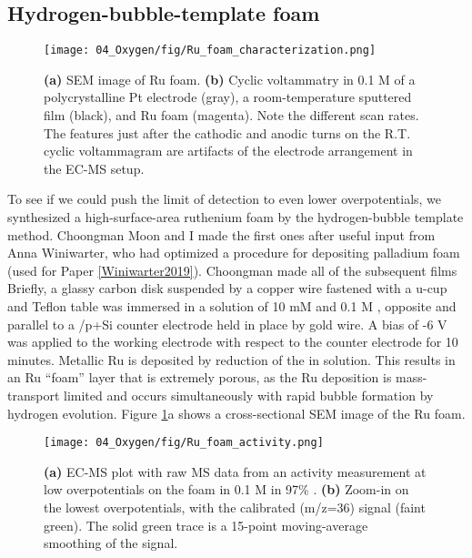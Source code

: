 \subsection{Hydrogen-bubble-template  foam}\label{subsec:Ru_foam}

\begin{figure}[h!]
	\centering
	\texttt{[image: 04\_Oxygen/fig/Ru\_foam\_characterization.png]}
	\caption{\textbf{(a)} SEM image of Ru foam. \textbf{(b)} Cyclic voltammatry in 0.1 M  of a polycrystalline Pt electrode (gray), a room-temperature sputtered  film (black), and Ru foam (magenta). Note the different scan rates. The features just after the cathodic and anodic turns on the R.T.  cyclic voltammagram are artifacts of the electrode arrangement in the EC-MS setup.}
	\label{fig:Ru_foam_char}
\end{figure}

To see if we could push the limit of  detection to even lower overpotentials, we synthesized a high-surface-area ruthenium foam by the hydrogen-bubble template method. Choongman Moon and I made the first ones after useful input from Anna Winiwarter, who had optimized a procedure for depositing palladium foam (used for Paper \ref{Winiwarter2019}). Choongman made all of the subsequent films Briefly, a glassy carbon disk suspended by a copper wire fastened with a u-cup and Teflon table was immersed in a solution of 10 mM  and 0.1 M , opposite and parallel to a /p+Si counter electrode held in place by gold wire. A bias of -6 V was applied to the working electrode with respect to the counter electrode for 10 minutes. Metallic Ru is deposited by reduction of the  in solution. This results in an Ru ``foam'' layer that is extremely porous, as the Ru deposition is mass-transport limited and occurs simultaneously with rapid bubble formation by hydrogen evolution. Figure \ref{fig:Ru_foam_char}a shows a cross-sectional SEM image of the Ru foam.

\begin{figure}[h!]
	\centering
	\texttt{[image: 04\_Oxygen/fig/Ru\_foam\_activity.png]}
	\caption{\textbf{(a)} EC-MS plot with raw MS data from an activity measurement at low overpotentials on the  foam in 0.1 M  in 97\% . \textbf{(b)} Zoom-in on the lowest overpotentials, with the calibrated  (m/z=36) signal (faint green). The solid green trace is a 15-point moving-average smoothing of the  signal.}
	\label{fig:Ru_foam_activity}
\end{figure}


